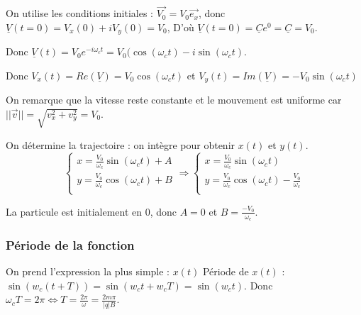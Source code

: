 \documentclass[french]{yLectureNote}
\renewcommand{\vec}{\overrightarrow}
\newcommand{\norm}[1]{||\vec{#1}||}
\begin{document}
On utilise les conditions initiales : $\vec{V_0} = V_0\vec{e_x}$, donc $\underline{V}(t=0) = V_x(0) + iV_y(0) = V_0$,
D'où $\underline{V}(t=0) =\underline{C}e^0 = \underline{C} = V_0$.

Donc $\underline{V}(t) = V_0e^{-i\omega_c t} = V_0(\cos(\omega_c t) - i\sin(\omega_c t)$.

Donc $V_x(t) = Re(\underline{V}) = V_0\cos(\omega_c t)$ et $V_y(t) = Im(\underline{V}) = -V_0\sin(\omega_c t)$

On remarque que la vitesse reste constante et le mouvement est uniforme car $\norm{v} = \sqrt{v_x^2+v_y^2} = V_0$.

On détermine la trajectoire : on intègre pour obtenir $x(t)$ et $y(t)$.
\[
 \left\{\begin{matrix}
 x = \frac{V_0}{\omega_c}\sin(\omega_c t) + A \\
 y = \frac{V_0}{\omega_c } \cos(\omega_c t) + B\\
\end{matrix}\right.
\Rightarrow
\left\{\begin{matrix}
 x = \frac{V_0}{\omega_c}\sin(\omega_c t)  \\
 y = \frac{V_0}{\omega_c } \cos(\omega_c t) -\frac{V_0}{\omega_c }\\
\end{matrix}\right.
\]

La particule est initialement en 0, donc $A=0$ et $B = \frac{-V_0}{\omega_c}$.

\subsubsection{Période de la fonction}
On prend l'expression la plus simple : $x(t)$
Période de $x(t)$ : $\sin(w_c(t+T)) = \sin(w_ct +w_cT) = \sin(w_ct)$. Donc $\omega_cT = 2\pi \iff T = \frac{2\pi}{\omega} = \frac{2m\pi}{|q|B}$.
\end{document}
